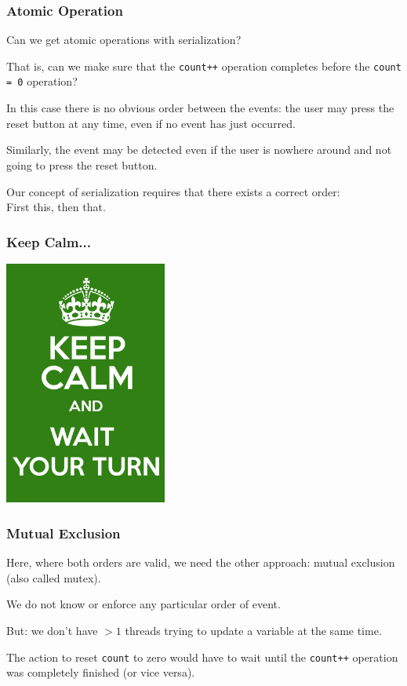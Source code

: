 \begin{frame}
	\frametitle{Atomic Operation}

	Can we get atomic operations with serialization?

	That is, can we make sure that the \texttt{count++} operation completes before the \texttt{count = 0} operation?

	In this case there is no obvious order between the events: the user may press the reset button at any time, even if no event has just occurred.

	Similarly, the event may be detected even if the user is nowhere around and not going to press the reset button.

	Our concept of serialization requires that there exists a correct order:\\
	\quad First this, then that.


\end{frame}


\begin{frame}
	\frametitle{Keep Calm...}

	\begin{center}
		\includegraphics[width=0.4\textwidth]{images/waityourturn.png}
	\end{center}

\end{frame}


\begin{frame}
	\frametitle{Mutual Exclusion}

	Here, where both orders are valid, we need the other approach: mutual exclusion (also called \alert{mutex}).

	We do not know or enforce any particular order of event.

	But: we don't have $>1$ threads trying to update a variable at the same time.

	The action to reset \texttt{count} to zero would have to wait until the \texttt{count++} operation was completely finished (or vice versa).


\end{frame}


